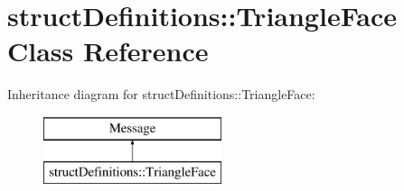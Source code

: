 \hypertarget{classstruct_definitions_1_1_triangle_face}{}\section{struct\+Definitions\+:\+:Triangle\+Face Class Reference}
\label{classstruct_definitions_1_1_triangle_face}
Inheritance diagram for struct\+Definitions\+:\+:Triangle\+Face\+:\begin{figure}[H]
\begin{center}
\leavevmode
\includegraphics[height=2.000000cm]{classstruct_definitions_1_1_triangle_face}
\end{center}
\end{figure}

